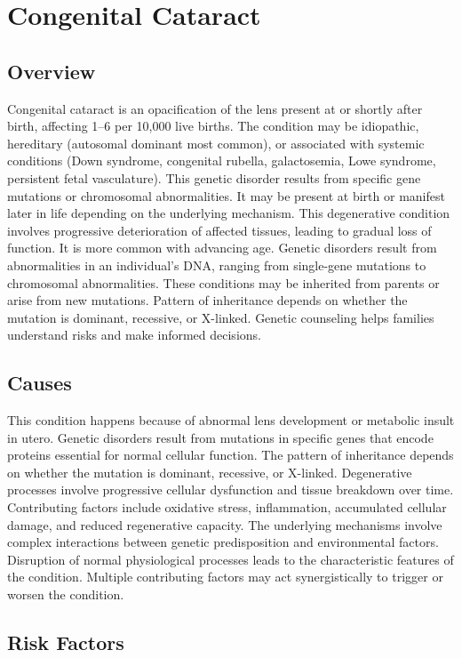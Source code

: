 \chapter{Congenital Cataract}
\label{sec:Congenital Cataract}

\section{Overview}
Congenital cataract is an opacification of the lens present at or shortly after birth, affecting 1--6 per 10,000 live births. The condition may be idiopathic, hereditary (autosomal dominant most common), or associated with systemic conditions (Down syndrome, congenital rubella, galactosemia, Lowe syndrome, persistent fetal vasculature). This genetic disorder results from specific gene mutations or chromosomal abnormalities. It may be present at birth or manifest later in life depending on the underlying mechanism. This degenerative condition involves progressive deterioration of affected tissues, leading to gradual loss of function. It is more common with advancing age. Genetic disorders result from abnormalities in an individual's DNA, ranging from single-gene mutations to chromosomal abnormalities. These conditions may be inherited from parents or arise from new mutations. Pattern of inheritance depends on whether the mutation is dominant, recessive, or X-linked. Genetic counseling helps families understand risks and make informed decisions.
\section{Causes}
This condition happens because of abnormal lens development or metabolic insult in utero. Genetic disorders result from mutations in specific genes that encode proteins essential for normal cellular function. The pattern of inheritance depends on whether the mutation is dominant, recessive, or X-linked. Degenerative processes involve progressive cellular dysfunction and tissue breakdown over time. Contributing factors include oxidative stress, inflammation, accumulated cellular damage, and reduced regenerative capacity. The underlying mechanisms involve complex interactions between genetic predisposition and environmental factors. Disruption of normal physiological processes leads to the characteristic features of the condition. Multiple contributing factors may act synergistically to trigger or worsen the condition.
\section{Risk Factors}


